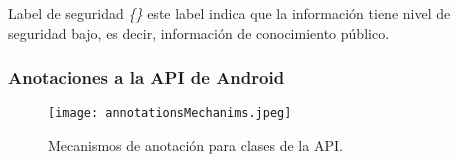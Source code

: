 Label de seguridad \emph{\{\}}\newline
este label indica que la información tiene nivel de seguridad bajo, es decir,
información de conocimiento público.

\subsubsection{Anotaciones a la API de Android}

\begin{figure}[h!]
	\begin{center}
	\texttt{[image: annotationsMechanims.jpeg]}
	\end{center}
	\caption{Mecanismos de anotación para clases de la API.}
	\label{fig:annotationsMechanims}
\end{figure}

